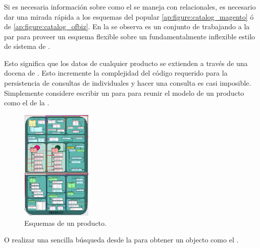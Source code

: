 \subsubsection{\catalogManagement}

Si es necesaria información sobre como el \catalogManagement se maneja con \dataBases relacionales, es necesario dar una mirada rápida a los esquemas del popular \nameMagento \ecommerce \framework \ref{ap:figure:catalog_magento} ó \ofBizNAME de \apacheNAME \ref{ap:figure:catalog_ofbiz}. En la   se observa es un conjunto de \tablesDB trabajando a la par para proveer un esquema flexible sobre un fundamentalmente inflexible estilo de sistema de \dataBase.

Esto significa que los datos de cualquier producto se extienden a través de una docena de \tablesDB. Esto incremente la complejidad del código requerido para la persistencia de consultas de \itemsCommerce individuales y hacer una consulta \shellBased es casi imposible. Simplemente considere escribir un \sql \join para para reunir el modelo de un producto como el de la .

\begin{figure}[h!]
	\centering
	\includegraphics[width=0.3\textwidth]{figuras/cap2/magento_product_schema.png}
	\caption{Esquemas de un producto.}
	\label{cap:figure:catalog_magento}
\end{figure}

O realizar una sencilla búsqueda desde la \shell \mongodbNAME \javaScriptNAME  para obtener un objecto \json como el .

